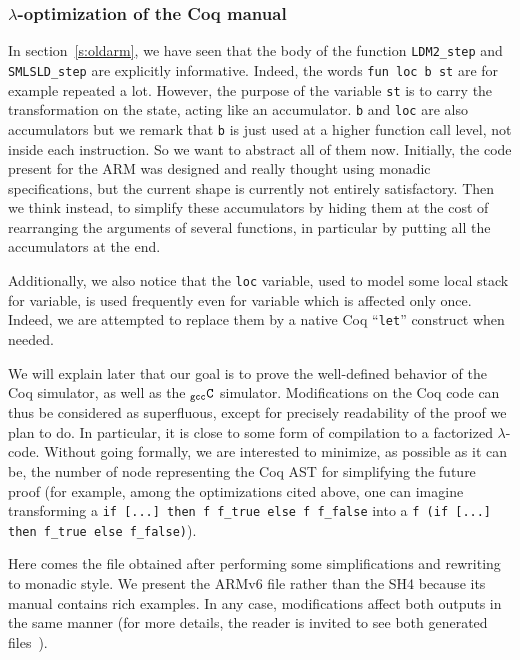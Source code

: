 \documentclass[a4paper, 11pt]{article}
\newcommand{\gccC}{$_{\tt gcc}{\tt C}$\xspace}
\begin{document}
    \subsubsection{$\lambda$-optimization of the Coq manual}
In section~\ref{s:oldarm}, we have seen that the body of the function \verb|LDM2_step| and \verb|SMLSLD_step| are explicitly informative. Indeed, the words \verb|fun loc b st| are for example repeated a lot. However, the purpose of the variable \verb|st| is to carry the transformation on the state, acting like an accumulator. \verb|b| and \verb|loc| are also accumulators but we remark that \verb|b| is just used at a higher function call level, not inside each instruction. So we want to abstract all of them now. Initially, the code present for the ARM was designed and really thought using monadic specifications, but the current shape is currently not entirely satisfactory. Then we think instead, to simplify these accumulators by hiding them at the cost of rearranging the arguments of several functions, in particular by putting all the accumulators at the end.

Additionally, we also notice that the \verb|loc| variable, used to model some local stack for variable, is used frequently even for variable which is affected only once. Indeed, we are attempted to replace them by a native Coq ``\verb|let|'' construct when needed.

\hspace{1ex}

We will explain later that our goal is to prove the well-defined behavior of the Coq simulator, as well as the \gccC simulator. Modifications on the Coq code can thus be considered as superfluous, except for precisely readability of the proof we plan to do. In particular, it is close to some form of compilation to a factorized $\lambda$-code. Without going formally, we are interested to minimize, as possible as it can be, the number of node representing the Coq AST for simplifying the future proof (for example, among the optimizations cited above, one can imagine transforming a {\tt if [...] then f f\_true else f f\_false} into a {\tt f (if [...] then f\_true else f\_false)}).

\hspace{1ex}

Here comes the file obtained after performing some simplifications and rewriting to monadic style. We present the ARMv6 file rather than the SH4 because its manual contains rich examples. In any case, modifications affect both outputs in the same manner (for more details, the reader is invited to see both generated files~\cite{urlsscert}).
\end{document}
